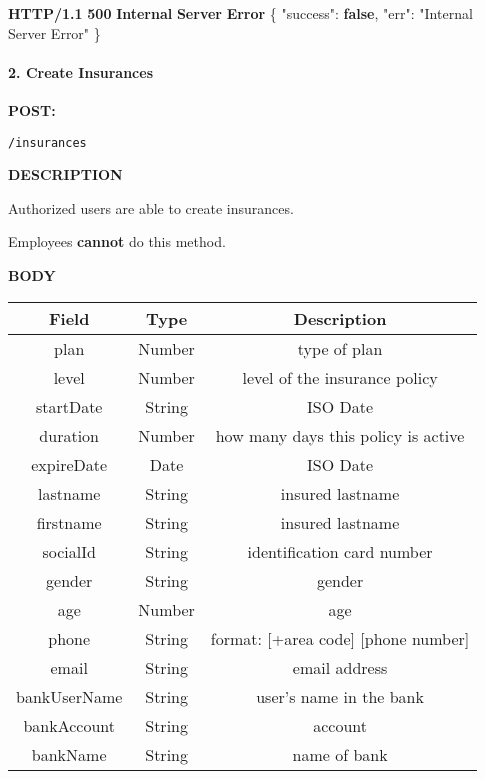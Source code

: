 \documentclass[
]{article}
\newenvironment{Shaded}{}{}
\newcommand{\DataTypeTok}[1]{\textcolor[rgb]{0.56,0.13,0.00}{#1}}
\newcommand{\ErrorTok}[1]{\textcolor[rgb]{1.00,0.00,0.00}{\textbf{#1}}}
\newcommand{\FunctionTok}[1]{\textcolor[rgb]{0.02,0.16,0.49}{#1}}
\newcommand{\KeywordTok}[1]{\textcolor[rgb]{0.00,0.44,0.13}{\textbf{#1}}}
\newcommand{\StringTok}[1]{\textcolor[rgb]{0.25,0.44,0.63}{#1}}
\begin{document}
\begin{Shaded}
\begin{Highlighting}[]
\ErrorTok{HTTP/1.1} \ErrorTok{500} \ErrorTok{Internal} \ErrorTok{Server} \ErrorTok{Error}
\FunctionTok{\{}
    \DataTypeTok{"success"}\FunctionTok{:} \KeywordTok{false}\FunctionTok{,}
    \DataTypeTok{"err"}\FunctionTok{:} \StringTok{"Internal Server Error"}
\FunctionTok{\}}
\end{Highlighting}
\end{Shaded}

\hypertarget{header-n613}{%
\paragraph{2. Create Insurances}\label{header-n613}}

\textbf{POST:}

\begin{verbatim}
/insurances
\end{verbatim}

\textbf{DESCRIPTION}

Authorized users are able to create insurances.

Employees \textbf{cannot} do this method.

\textbf{BODY}

\begin{longtable}[]{@{}ccc@{}}
\toprule
Field & Type & Description\tabularnewline
\midrule
\endhead
plan & Number & type of plan\tabularnewline
level & Number & level of the insurance policy\tabularnewline
startDate & String & ISO Date\tabularnewline
duration & Number & how many days this policy is active\tabularnewline
expireDate & Date & ISO Date\tabularnewline
lastname & String & insured lastname\tabularnewline
firstname & String & insured lastname\tabularnewline
socialId & String & identification card number\tabularnewline
gender & String & gender\tabularnewline
age & Number & age\tabularnewline
phone & String & format: {[}+area code{]} {[}phone
number{]}\tabularnewline
email & String & email address\tabularnewline
bankUserName & String & user's name in the bank\tabularnewline
bankAccount & String & account\tabularnewline
bankName & String & name of bank\tabularnewline
\bottomrule
\end{longtable}
\end{document}
